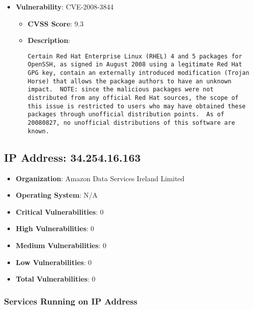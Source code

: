 \documentclass{article}
\begin{document}
\begin{itemize}
        \item \textbf{Vulnerability}: CVE-2008-3844
        \begin{itemize}
            \item \textbf{CVSS Score}:  9.3 
            \item \textbf{Description}:
            \parbox[t]{0.9\linewidth}{
                \verb|Certain Red Hat Enterprise Linux (RHEL) 4 and 5 packages for OpenSSH, as signed in August 2008 using a legitimate Red Hat GPG key, contain an externally introduced modification (Trojan Horse) that allows the package authors to have an unknown impact.  NOTE: since the malicious packages were not distributed from any official Red Hat sources, the scope of this issue is restricted to users who may have obtained these packages through unofficial distribution points.  As of 20080827, no unofficial distributions of this software are known.|
            }
        \end{itemize}
    
\end{itemize}




\clearpage



\subsection*{IP Address: 34.254.16.163}

\begin{itemize}
    \item \textbf{Organization}: Amazon Data Services Ireland Limited
    \item \textbf{Operating System}:  N/A 
    \item \textbf{Critical Vulnerabilities}: 0
    \item \textbf{High Vulnerabilities}: 0
    \item \textbf{Medium Vulnerabilities}: 0
    \item \textbf{Low Vulnerabilities}: 0
    \item \textbf{Total Vulnerabilities}: 0
\end{itemize}

\subsubsection*{Services Running on IP Address}
\end{document}
